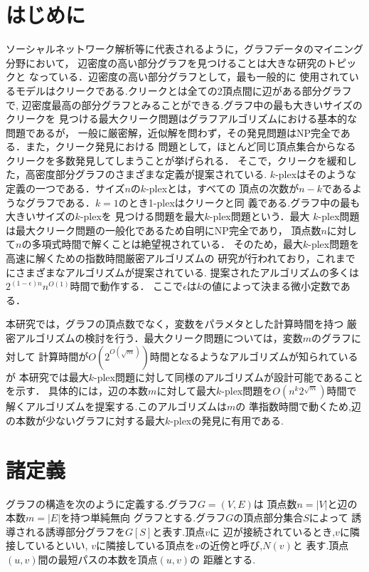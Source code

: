 \documentclass[a4j,twoside]{jarticle}
\begin{document}
\twocolumn[\vspace*{9mm}]     %
\begin{論文概要}              %
\setcounter{page}{2}          %

\section{はじめに}
ソーシャルネットワーク解析等に代表されるように，グラフデータのマイニング分野において，
辺密度の高い部分グラフを見つけることは大きな研究のトピックと
なっている\cite{washio2003state}．辺密度の高い部分グラフとして，最も一般的に
使用されているモデルはクリークである.クリークとは全ての2頂点間に辺がある部分グラフで,
辺密度最高の部分グラフとみることができる.グラフ中の最も大きいサイズのクリークを
見つける最大クリーク問題はグラフアルゴリズムにおける基本的な問題であるが，
一般に厳密解，近似解を問わず，その発見問題はNP完全である．また，クリーク発見における
問題として，ほとんど同じ頂点集合からなるクリークを多数発見してしまうことが挙げられる．
そこで，クリークを緩和した，高密度部分グラフのさまざまな定義が提案されている.
$k$-plexはそのような定義の一つである．サイズ$n$の$k$-plexとは，すべての
頂点の次数が$n-k$であるようなグラフである．$k=1$のとき1-plexはクリークと同
義である.グラフ中の最も大きいサイズの$k$-plexを
見つける問題を最大$k$-plex問題という．最大
$k$-plex問題は最大クリーク問題の一般化であるため自明にNP完全であり，
頂点数$n$に対して$n$の多項式時間で解くことは絶望視されている．
そのため，最大$k$-plex問題を高速に解くための指数時間厳密アルゴリズムの
研究が行われており，これまでにさまざまなアルゴリズムが提案されている.
提案されたアルゴリズムの多くは$2^{(1-\epsilon)n}n^{O(1)}$時間で動作する．
ここで$\epsilon$は$k$の値によって決まる微小定数である．

本研究では，グラフの頂点数でなく，変数をパラメタとした計算時間を持つ
厳密アルゴリズムの検討を行う．最大クリーク問題については，変数$m$のグラフに対して
計算時間が$O(2^{O(\sqrt{m})})$時間となるようなアルゴリズムが知られているが
本研究では最大$k$-plex問題に対して同様のアルゴリズムが設計可能であることを示す．
具体的には，辺の本数$m$に対して最大$k$-plex問題を$O(n^{k}2^{\sqrt{m}})$時間で
解くアルゴリズムを提案する.このアルゴリズムは$m$の
準指数時間で動くため,辺の本数が少ないグラフに対する最大$k$-plexの発見に有用である.  

\section{諸定義}
グラフの構造を次のように定義する.グラフ$G=(V,E)$は
頂点数$n=|V|$と辺の本数$m=|E|$を持つ単純無向
グラフとする.グラフ$G$の頂点部分集合$S$によって
誘導される誘導部分グラフを$G[S]$と表す.頂点$v$に
辺が接続されているとき,$v$に隣接しているといい,
$v$に隣接している頂点を$v$の近傍と呼び,$N(v)$と
表す.頂点$(u,v)$間の最短パスの本数を頂点$(u,v)$の
距離とする.


\end{論文概要}
\end{document}
